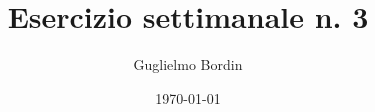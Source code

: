 \documentclass[10pt]{gulartcl}
\title{Esercizio settimanale n. 3}
\author{Guglielmo Bordin}
\date{\today}
\begin{document}
\maketitle
    
\noindent
\end{document}
